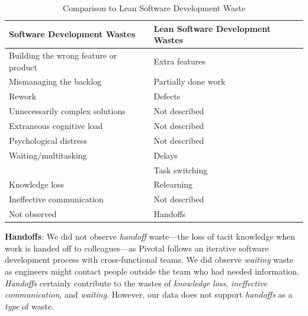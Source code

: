 \begin{table}[t]
\renewcommand{\arraystretch}{1.5}
\centering
\caption{Comparison to Lean Software Development Waste}
\label{LeanSoftwareDevelopmentComparisonTable}
\begin{tabular}{|p{1.57in}|p{1.57in}|}
\hline
Software Development Wastes           & Lean Software Development Wastes \\ \hline
Building the wrong feature or product & Extra features                            \\ \hline
Mismanaging the backlog               & Partially done work                            \\ \hline
Rework                                & Defects                                   \\ \hline
Unnecessarily complex solutions                & Not described                             \\ \hline
Extraneous cognitive load                 & Not described  \\ \hline
Psychological distress                             & Not described \\ \hline
Waiting/multitasking                              & Delays                                    \\  
                  & Task switching  \\ \hline
Knowledge loss                 & Relearning                            \\ \hline
Ineffective communication             & Not described                             \\ \hline
Not observed                          & Handoffs                                  \\ \hline
\end{tabular}
\end{table}




\textbf{Handoffs}: We did not observe \textit{handoff} waste---the loss of tacit knowledge when work is handed off to colleagues---as Pivotal follows an iterative software development process with cross-functional teams. We did observe \textit{waiting} waste as engineers might contact people outside the team who had needed information. \textit{Handoffs} certainly contribute to the wastes of \textit{knowledge loss}, \textit{ineffective communication}, and \textit{waiting}. However, our data does not support \textit{handoffs} as a \textit{type} of waste.

